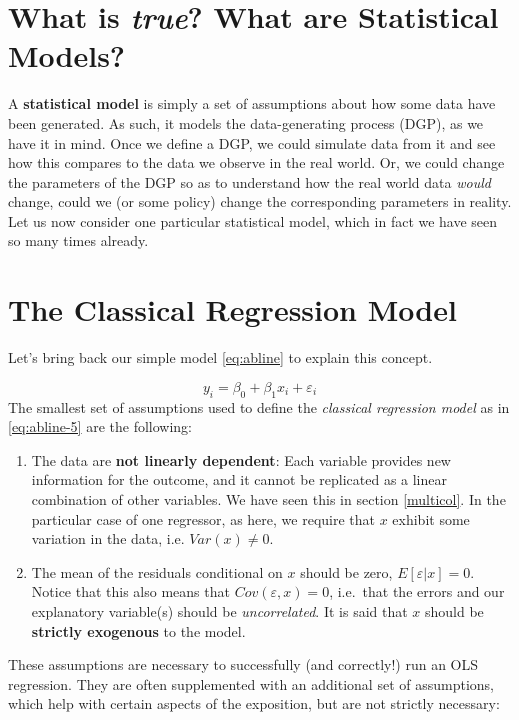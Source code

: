 \documentclass[]{book}
\providecommand{\tightlist}{%
  \setlength{\itemsep}{0pt}\setlength{\parskip}{0pt}}
\theoremstyle{definition}
\theoremstyle{definition}
\theoremstyle{definition}
\theoremstyle{remark}
\begin{document}
\section{\texorpdfstring{What is \emph{true}? What are Statistical
Models?}{What is true? What are Statistical Models?}}\label{what-is-true-what-are-statistical-models}

A \textbf{statistical model} is simply a set of assumptions about how
some data have been generated. As such, it models the data-generating
process (DGP), as we have it in mind. Once we define a DGP, we could
simulate data from it and see how this compares to the data we observe
in the real world. Or, we could change the parameters of the DGP so as
to understand how the real world data \emph{would} change, could we (or
some policy) change the corresponding parameters in reality. Let us now
consider one particular statistical model, which in fact we have seen so
many times already.

\section{The Classical Regression Model}\label{class-reg}

Let's bring back our simple model \eqref{eq:abline} to explain this
concept.

\[
y_i = \beta_0 + \beta_1 x_i + \varepsilon_i \label{eq:abline-5}
\] The smallest set of assumptions used to define the \emph{classical
regression model} as in \eqref{eq:abline-5} are the following:

\begin{enumerate}
\def\labelenumi{\arabic{enumi}.}
\tightlist
\item
  The data are \textbf{not linearly dependent}: Each variable provides
  new information for the outcome, and it cannot be replicated as a
  linear combination of other variables. We have seen this in section
  \ref{multicol}. In the particular case of one regressor, as here, we
  require that \(x\) exhibit some variation in the data, i.e.
  \(Var(x)\neq 0\).
\item
  The mean of the residuals conditional on \(x\) should be zero,
  \(E[\varepsilon|x] = 0\). Notice that this also means that
  \(Cov(\varepsilon,x) = 0\), i.e.~that the errors and our explanatory
  variable(s) should be \emph{uncorrelated}. It is said that \(x\)
  should be \textbf{strictly exogenous} to the model.
\end{enumerate}

These assumptions are necessary to successfully (and correctly!) run an
OLS regression. They are often supplemented with an additional set of
assumptions, which help with certain aspects of the exposition, but are
not strictly necessary:
\end{document}

